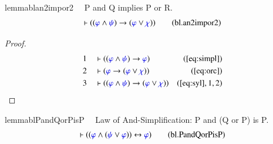 \begin{restatable}{lemma}{blan2impor2}~~ P and Q implies P or R.
\begin{align}
\vdash ( ( \mw{\varphi} \wedge \mw{\psi} ) \rightarrow ( \mw{\varphi} \vee
    \mw{\chi} ) )\label{eq:bl.an2impor2}\tag{bl.an2impor2}
\end{align}
\end{restatable}

\begin{proof}
\begin{align}
  1 &&  & \vdash ( ( \mw{\varphi} \wedge \mw{\psi} ) \rightarrow \mw{\varphi}
      )&(\mbox{\ref{eq:simpl}})\notag
  \\ 2 &&  & \vdash ( \mw{\varphi} \rightarrow ( \mw{\varphi} \vee \mw{\chi} )
      )&(\mbox{\ref{eq:orc}})\notag
  \\ 3 &&  & \vdash ( ( \mw{\varphi} \wedge \mw{\psi} ) \rightarrow (
      \mw{\varphi} \vee \mw{\chi} )
      )&(\mbox{\ref{eq:syl}},1,2)\notag
\end{align}
\end{proof}

\begin{restatable}{lemma}{blPandQorPisP}~~ Law of And-Simplification: P and (Q
or P) is P.
\begin{align}
\vdash ( ( \mw{\varphi} \wedge ( \mw{\psi} \vee \mw{\varphi} ) )
    \leftrightarrow \mw{\varphi} )\label{eq:bl.PandQorPisP}\tag{bl.PandQorPisP}
\end{align}
\end{restatable}

